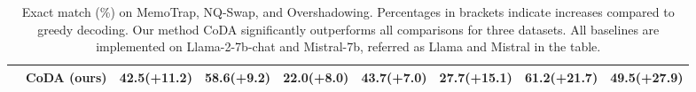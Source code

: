 \begin{table*}[t]
\begin{tabular}{cclllllll}
 & \textbf{CoDA (ours)} & \textbf{42.5}\tiny{(+11.2)} & \textbf{58.6}\tiny{(+9.2)} & \textbf{22.0}\tiny{(+8.0)} & \textbf{43.7}\tiny{(+7.0)} & \textbf{27.7}\tiny{(+15.1)} & \textbf{61.2}\tiny{(+21.7)} & \textbf{49.5}\tiny{(+27.9)} \\ 
\bottomrule
\end{tabular}
\caption{Exact match (\%) on MemoTrap, NQ-Swap, and Overshadowing. Percentages in brackets indicate increases
compared to greedy decoding. Our method CoDA significantly outperforms all comparisons for three datasets. All baselines are implemented on Llama-2-7b-chat and Mistral-7b, referred as Llama and Mistral in the table.}
\vspace{-2mm}
\label{tab:main_results}
\end{table*}